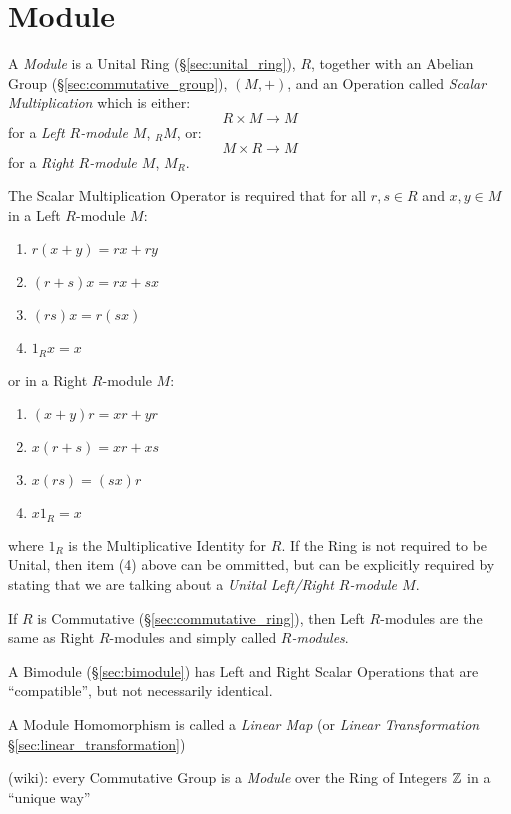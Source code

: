 \section{Module}\label{sec:module}

A \emph{Module} is a Unital Ring (\S\ref{sec:unital_ring}), $R$, together with
an Abelian Group (\S\ref{sec:commutative_group}), $(M, +)$, and an Operation
called \emph{Scalar Multiplication} which is either:
\[ R \times M \rightarrow M \]
for a \emph{Left $R$-module $M$}, $_R M$, or:
\[ M \times R \rightarrow M \]
for a \emph{Right $R$-module $M$}, $M_R$.

The Scalar Multiplication Operator is required that for all $r,s \in R$ and
$x,y \in M$ in a Left $R$-module $M$:
\begin{enumerate}
    \item $r(x + y) = rx + ry$
    \item $(r + s)x = rx + sx$
    \item $(rs)x = r(sx)$
    \item $1_Rx = x$
\end{enumerate}
or in a Right $R$-module $M$:
\begin{enumerate}
    \item $(x + y)r = xr + yr$
    \item $x(r + s) = xr + xs$
    \item $x(rs) = (sx)r$
    \item $x 1_R = x$
\end{enumerate}
where $1_R$ is the Multiplicative Identity for $R$. If the Ring is not
required to be Unital, then item (4) above can be ommitted, but can be
explicitly required by stating that we are talking about a
\emph{Unital Left/Right $R$-module $M$}.

If $R$ is Commutative (\S\ref{sec:commutative_ring}), then Left $R$-modules are
the same as Right $R$-modules and simply called \emph{$R$-modules}.

A Bimodule (\S\ref{sec:bimodule}) has Left and Right Scalar Operations that are
``compatible'', but not necessarily identical.

A Module Homomorphism is called a \emph{Linear Map} (or \emph{Linear
  Transformation} \S\ref{sec:linear_transformation})

(wiki): every Commutative Group is a \emph{Module} over the Ring of Integers
$\mathbb{Z}$ in a ``unique way''

